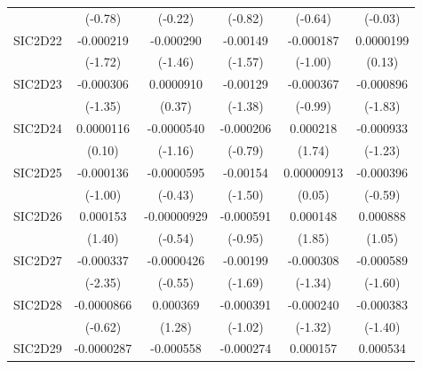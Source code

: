 \begin{table}[htbp]
\begin{tabular}{l*{5}{c}}
            &     (-0.78)         &     (-0.22)         &     (-0.82)         &     (-0.64)         &     (-0.03)         \\
SIC2D22     &   -0.000219         &   -0.000290         &    -0.00149         &   -0.000187         &   0.0000199         \\
            &     (-1.72)         &     (-1.46)         &     (-1.57)         &     (-1.00)         &      (0.13)         \\
SIC2D23     &   -0.000306         &   0.0000910         &    -0.00129         &   -0.000367         &   -0.000896         \\
            &     (-1.35)         &      (0.37)         &     (-1.38)         &     (-0.99)         &     (-1.83)         \\
SIC2D24     &   0.0000116         &  -0.0000540         &   -0.000206         &    0.000218         &   -0.000933         \\
            &      (0.10)         &     (-1.16)         &     (-0.79)         &      (1.74)         &     (-1.23)         \\
SIC2D25     &   -0.000136         &  -0.0000595         &    -0.00154         &  0.00000913         &   -0.000396         \\
            &     (-1.00)         &     (-0.43)         &     (-1.50)         &      (0.05)         &     (-0.59)         \\
SIC2D26     &    0.000153         & -0.00000929         &   -0.000591         &    0.000148         &    0.000888         \\
            &      (1.40)         &     (-0.54)         &     (-0.95)         &      (1.85)         &      (1.05)         \\
SIC2D27     &   -0.000337\sym{*}  &  -0.0000426         &    -0.00199         &   -0.000308         &   -0.000589         \\
            &     (-2.35)         &     (-0.55)         &     (-1.69)         &     (-1.34)         &     (-1.60)         \\
SIC2D28     &  -0.0000866         &    0.000369         &   -0.000391         &   -0.000240         &   -0.000383         \\
            &     (-0.62)         &      (1.28)         &     (-1.02)         &     (-1.32)         &     (-1.40)         \\
SIC2D29     &  -0.0000287         &   -0.000558\sym{*}  &   -0.000274         &    0.000157         &    0.000534         \\

\end{tabular}
\end{table}
